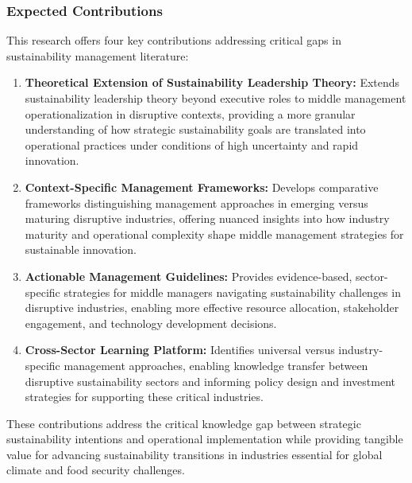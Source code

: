	\subsubsection{Expected Contributions}
	This research offers four key contributions addressing critical gaps in sustainability management literature:
	\begin{enumerate}
		\item \textbf{Theoretical Extension of Sustainability Leadership Theory:} Extends sustainability leadership theory beyond executive roles to middle management operationalization in disruptive contexts, providing a more granular understanding of how strategic sustainability goals are translated into operational practices under conditions of high uncertainty and rapid innovation. \\
		\item \textbf{Context-Specific Management Frameworks:} Develops comparative frameworks distinguishing management approaches in emerging versus maturing disruptive industries, offering nuanced insights into how industry maturity and operational complexity shape middle management strategies for sustainable innovation. \\
		\item \textbf{Actionable Management Guidelines:} Provides evidence-based, sector-specific strategies for middle managers navigating sustainability challenges in disruptive industries, enabling more effective resource allocation, stakeholder engagement, and technology development decisions. \\
		\item \textbf{Cross-Sector Learning Platform:} Identifies universal versus industry-specific management approaches, enabling knowledge transfer between disruptive sustainability sectors and informing policy design and investment strategies for supporting these critical industries. \\
	\end{enumerate}
	These contributions address the critical knowledge gap between strategic sustainability intentions and operational implementation while providing tangible value for advancing sustainability transitions in industries essential for global climate and food security challenges. \\
	
	
